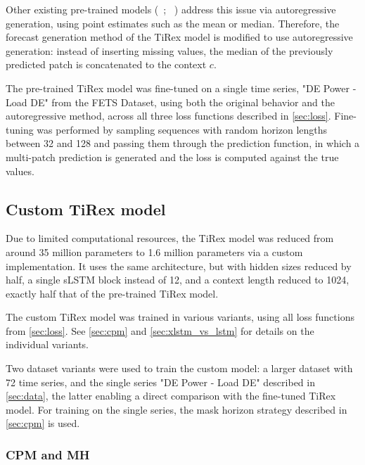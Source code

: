 \documentclass[a4paper,oneside,10pt,ngerman,english]{scrartcl}
\begin{document}
Other existing pre-trained models (\citeauthor{das2024decoderonlyfoundationmodeltimeseries}~\cite{das2024decoderonlyfoundationmodeltimeseries}; \citeauthor{ansari2024fast}~\cite{ansari2024fast}) address this issue via autoregressive generation, using point estimates such as the mean or median. Therefore, the forecast generation method of the TiRex model is modified to use autoregressive generation: instead of inserting missing values, the median of the previously predicted patch is concatenated to the context $c$.

The pre-trained TiRex model was fine-tuned on a single time series, "DE Power - Load DE" from the FETS Dataset, using both the original behavior and the autoregressive method, across all three loss functions described in \autoref{sec:loss}. Fine-tuning was performed by sampling sequences with random horizon lengths between 32 and 128 and passing them through the prediction function, in which a multi-patch prediction is generated and the loss is computed against the true values.

\subsection{Custom TiRex model}
\label{sec:custom_tirex}

Due to limited computational resources, the TiRex model was reduced from around 35 million parameters to 1.6 million parameters via a custom implementation. It uses the same architecture, but with hidden sizes reduced by half, a single sLSTM block instead of 12, and a context length reduced to 1024, exactly half that of the pre-trained TiRex model.

The custom TiRex model was trained in various variants, using all loss functions from \autoref{sec:loss}. See \autoref{sec:cpm} and \autoref{sec:xlstm_vs_lstm} for details on the individual variants.

Two dataset variants were used to train the custom model: a larger dataset with 72 time series, and the single series "DE Power - Load DE" described in \autoref{sec:data}, the latter enabling a direct comparison with the fine-tuned TiRex model. For training on the single series, the mask horizon strategy described in \autoref{sec:cpm} is used.

\subsubsection{CPM and MH}
\label{sec:cpm}
 
\end{document}

